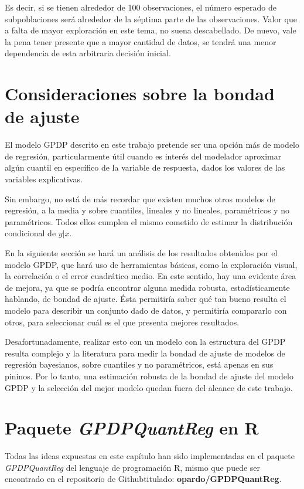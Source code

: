 Es decir, si se tienen alrededor de 100 observaciones, el n\'umero esperado de subpoblaciones ser\'a alrededor de la s\'eptima parte de las observaciones. Valor que a falta de mayor exploraci\'on en este tema, no suena descabellado. De nuevo, vale la pena tener presente que a mayor cantidad de datos, se tendr\'a una menor dependencia de esta arbitraria decisi\'on inicial.

\section{Consideraciones sobre la bondad de ajuste}

El modelo GPDP descrito en este trabajo pretende ser una opci\'on m\'as de modelo de regresi\'on, particularmente \'util cuando es inter\'es del modelador aproximar alg\'un cuantil en espec\'ifico de la variable de respuesta, dados los valores de las variables explicativas.

Sin embargo, no est\'a de m\'as recordar que existen muchos otros modelos de regresi\'on, a la media y sobre cuantiles, lineales y no lineales, param\'etricos y no param\'etricos. Todos ellos cumplen el mismo cometido de estimar la distribuci\'on condicional de $y|x$.

En la siguiente secci\'on se har\'a un an\'alisis de los resultados obtenidos por el modelo GPDP, que har\'a uso de herramientas b\'asicas, como la exploraci\'on visual, la correlaci\'on o el error cuadr\'atico medio. En este sentido, hay una evidente \'area de mejora, ya que se podr\'ia encontrar alguna medida robusta, estad\'isticamente hablando, de bondad de ajuste. \'Esta permitir\'ia saber qu\'e tan bueno resulta el modelo para describir un conjunto dado de datos, y permitir\'ia compararlo con otros, para seleccionar cu\'al es el que presenta mejores resultados. 

Desafortunadamente, realizar esto con un modelo con la estructura del GPDP resulta complejo y la literatura para medir la bondad de ajuste de modelos de regresi\'on bayesianos, sobre cuantiles y no param\'etricos, est\'a apenas en sus pininos. Por lo tanto, una estimaci\'on robusta de la bondad de ajuste del modelo GPDP y la selecci\'on del mejor modelo quedan fuera del alcance de este trabajo.


\section{Paquete \textit{GPDPQuantReg} en R}

Todas las ideas expuestas en este cap\'itulo han sido implementadas en el paquete \textit{GPDPQuantReg} del lenguaje de programaci\'on R, mismo que puede ser encontrado en el repositorio de Github\faGithub \space titulado: \textbf{opardo/GPDPQuantReg}.

